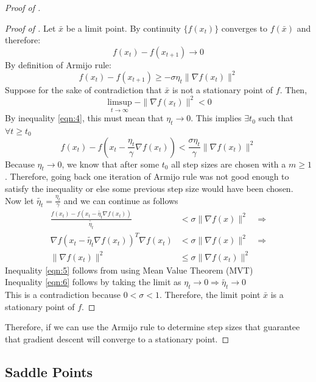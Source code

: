 \begin{proof}[Proof of ]
\begin{proof}[Proof of ]
Let $\bar{x}$ be a limit point. By continuity $\{f(x_t)\}$ converges to $f(\bar{x})$ and therefore:
\[
    f(x_t) - f(x_{t+1}) \to 0
\]
By definition of Armijo rule:
\begin{equation}
    f(x_t) - f(x_{t+1}) \ge -\sigma \eta_t \|\nabla f(x_t)\|^2 \label{eqn:4}
\end{equation}
Suppose for the sake of contradiction that $\bar{x}$ is not a stationary point of $f$. Then,
\[
    \limsup_{t \to \infty} -\|\nabla f(x_t)\|^2 < 0
\]
By inequality \ref{eqn:4}, this must mean that $\eta_t \to 0$. This implies $\exists t_0$ such that $\forall t \ge t_0$
\[
    f(x_t) - f(x_t - \frac{\eta_t}{\gamma} \nabla f(x_t)) < \frac{\sigma \eta_t}{\gamma} \|\nabla f(x_t)\|^2
\]
Because $\eta_t \to 0$, we know that after some $t_0$ all step sizes are chosen with a $m\ge 1$. Therefore, going back one iteration of Armijo rule was not good enough to satisfy the inequality or else some previous step size would have been chosen.\\
\newline
Now let $\tilde{\eta_t} = \frac{\eta_t}{\gamma}$ and we can continue as follows
\begin{align}
    \frac{f(x_t) - f(x_t - \tilde{\eta_t} \nabla f(x_t))}{\tilde{\eta_t}} &< \sigma \|\nabla f(x)\|^2 &\Rightarrow \nonumber\\
    \nabla f(x_t - \tilde{\eta_t} \nabla f(x_t))^T \nabla f(x_t) &< \sigma \|\nabla f(x)\|^2 &\Rightarrow \label{eqn:5}\\
    \|\nabla f(x_t) \|^2 &\le \sigma \|\nabla f(x_t) \|^2 & \label{eqn:6}
\end{align}
\newline
Inequality \ref{eqn:5} follows from using Mean Value Theorem (MVT)\\
Inequality \ref{eqn:6} follows by taking the limit as $\eta_t \to 0 \Rightarrow \tilde{\eta_t} \to 0$\\
\newline
This is a contradiction because $0 < \sigma < 1$. Therefore, the limit point $\bar{x}$ is a stationary point of $f$.
\end{proof}
Therefore, if we can use the Armijo rule to determine step sizes that guarantee that gradient descent will converge to a stationary point.
\end{proof}

\subsection{Saddle Points}

